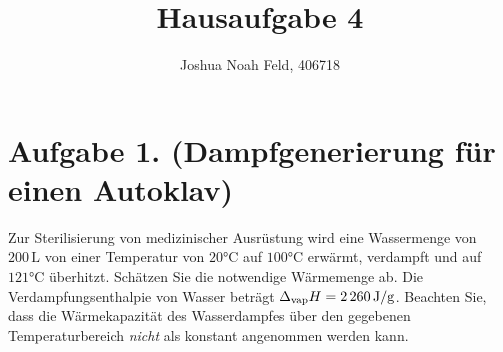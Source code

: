 \documentclass[german,12pt]{homework}
\title{Hausaufgabe 4}
\author{Joshua Noah Feld, 406718}
\institute{RWTH Aachen University\\Aachener Verfahrenstechnik}
\begin{document}
    \maketitle

    \section*{Aufgabe 1. (Dampfgenerierung für einen Autoklav)}

    \begin{problem}
        Zur Sterilisierung von medizinischer Ausrüstung wird eine Wassermenge von \(200\,\si{\liter}\) von einer Temperatur von \(20\si{\degreeCelsius}\) auf \(100\si{\degreeCelsius}\) erwärmt, verdampft und auf \(121\si{\degreeCelsius}\) überhitzt. Schätzen Sie die notwendige Wärmemenge ab. Die Verdampfungsenthalpie von Wasser beträgt \(\Delta_\text{vap}H = 2\,260\,\si{\joule\per{\g}}\). Beachten Sie, dass die Wärmekapazität des Wasserdampfes über den gegebenen Temperaturbereich \emph{nicht} als konstant angenommen werden kann.
    \end{problem}
\end{document}
